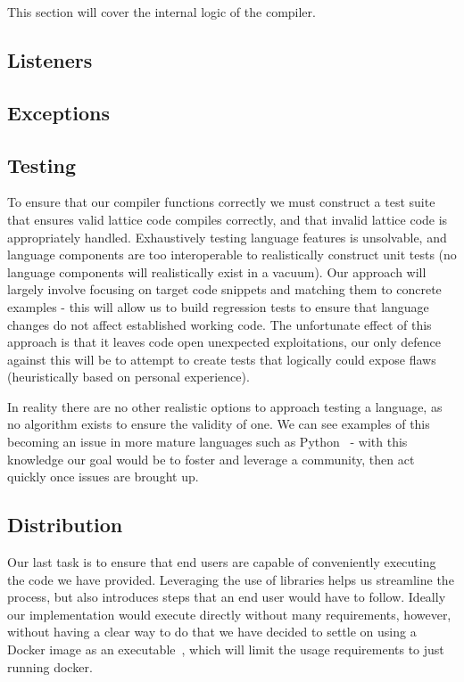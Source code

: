 This section will cover the internal logic of the compiler.

\subsection{Listeners}

\subsection{Exceptions}

\subsection{Testing}
To ensure that our compiler functions correctly we must construct a test suite that ensures valid lattice code compiles
correctly, and that invalid lattice code is appropriately handled.
Exhaustively testing language features is unsolvable, and language components are too interoperable to realistically
construct unit tests (no language components will realistically exist in a vacuum).
Our approach will largely involve focusing on target code snippets and matching them to concrete examples - this will
allow us to build regression tests to ensure that language changes do not affect established working code.
The unfortunate effect of this approach is that it leaves code open unexpected exploitations, our only defence against
this will be to attempt to create tests that logically could expose flaws (heuristically based on personal experience).

In reality there are no other realistic options to approach testing a language, as no algorithm exists to ensure the
validity of one.
We can see examples of this becoming an issue in more mature languages such as Python~\cite{PythonIssue} - with this
knowledge our goal would be to foster and leverage a community, then act quickly once issues are brought up.

\subsection{Distribution}
Our last task is to ensure that end users are capable of conveniently executing the code we have provided.
Leveraging the use of libraries helps us streamline the process, but also introduces steps that an end user would have
to follow.
Ideally our implementation would execute directly without many requirements, however, without having a clear way to do
that we have decided to settle on using a Docker image as an executable~\cite{DockerExec}, which will limit the usage
requirements to just running docker.

